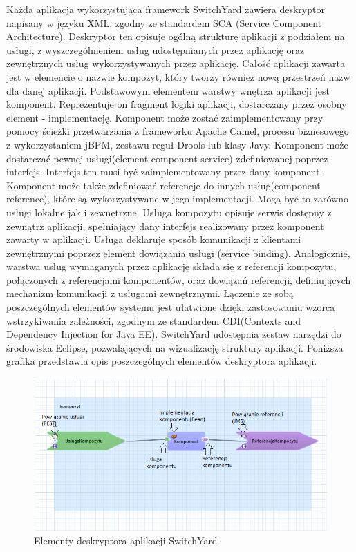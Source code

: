 Każda aplikacja wykorzystująca framework SwitchYard zawiera deskryptor napisany w języku XML, zgodny ze standardem SCA (Service Component Architecture). Deskryptor ten opisuje ogólną strukturę aplikacji z podziałem na usługi, z wyszczególnieniem usług udostępnianych przez aplikację oraz zewnętrznych usług wykorzystywanych przez aplikację. 
Całość aplikacji zawarta jest w elemencie o nazwie kompozyt, który tworzy również nową przestrzeń nazw dla danej aplikacji. 
Podstawowym elementem warstwy wnętrza aplikacji jest komponent. Reprezentuje on fragment logiki aplikacji, dostarczany przez osobny element - implementację. Komponent może zostać zaimplementowany przy pomocy ścieżki przetwarzania z frameworku Apache Camel, procesu biznesowego z wykorzystaniem jBPM, zestawu reguł Drools lub klasy Javy. Komponent może dostarczać pewnej usługi(element component service) zdefiniowanej poprzez interfejs. Interfejs ten musi być zaimplementowany przez dany komponent. Komponent może także zdefiniować referencje do innych usług(component reference), które są wykorzystywane w jego implementacji. Mogą być to zarówno usługi lokalne jak i zewnętrzne.
Usługa kompozytu opisuje serwis dostępny z zewnątrz aplikacji, spełniający dany interfejs realizowany przez komponent zawarty w aplikacji. Usługa deklaruje sposób komunikacji z klientami zewnętrznymi poprzez element dowiązania usługi (service binding). 
Analogicznie, warstwa usług wymaganych przez aplikację składa się z referencji kompozytu, połączonych z referencjami komponentów, oraz dowiązań referencji, definiujących mechanizm komunikacji z usługami zewnętrznymi.
Łączenie ze sobą poszczególnych elementów systemu jest ułatwione dzięki zastosowaniu wzorca wstrzykiwania zależności, zgodnym ze standardem CDI(Contexts and Dependency Injection for Java EE).
SwitchYard udostępnia zestaw narzędzi do środowiska Eclipse, pozwalających na wizualizację struktury aplikacji. Poniższa grafika przedstawia opis poszczególnych elementów deskryptora aplikacji.

		\begin{figure}[h]
			\centering
			\includegraphics[width=\textwidth]{img/switchyard2.png}
			\caption{Elementy deskryptora aplikacji SwitchYard}
			\label{Elementy deskryptora aplikacji SwitchYard}
		\end{figure}

